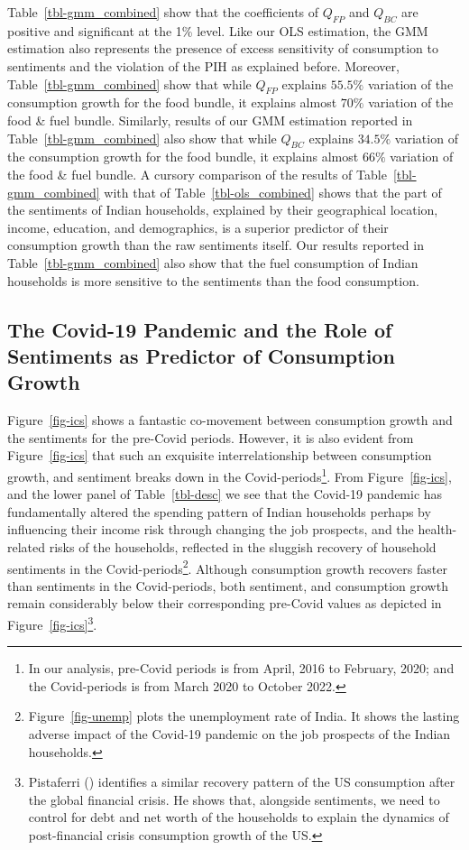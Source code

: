\documentclass[
  abstract]{scrartcl}
\begin{document}
Table~\ref{tbl-gmm_combined} show that the coefficients of \(Q_{FP}\)
and \(Q_{BC}\) are positive and significant at the 1\% level. Like our
OLS estimation, the GMM estimation also represents the presence of
excess sensitivity of consumption to sentiments and the violation of the
PIH as explained before. Moreover, Table~\ref{tbl-gmm_combined} show
that while \(Q_{FP}\) explains \(55.5\%\) variation of the consumption
growth for the food bundle, it explains almost \(70\%\) variation of the
food \& fuel bundle. Similarly, results of our GMM estimation reported
in Table~\ref{tbl-gmm_combined} also show that while \(Q_{BC}\) explains
\(34.5\%\) variation of the consumption growth for the food bundle, it
explains almost \(66\%\) variation of the food \& fuel bundle. A cursory
comparison of the results of Table~\ref{tbl-gmm_combined} with that of
Table~\ref{tbl-ols_combined} shows that the part of the sentiments of
Indian households, explained by their geographical location, income,
education, and demographics, is a superior predictor of their
consumption growth than the raw sentiments itself. Our results reported
in Table~\ref{tbl-gmm_combined} also show that the fuel consumption of
Indian households is more sensitive to the sentiments than the food
consumption.

\subsection{The Covid-19 Pandemic and the Role of Sentiments as
Predictor of Consumption
Growth}\label{the-covid-19-pandemic-and-the-role-of-sentiments-as-predictor-of-consumption-growth}

Figure~\ref{fig-ics} shows a fantastic co-movement between consumption
growth and the sentiments for the pre-Covid periods. However, it is also
evident from Figure~\ref{fig-ics} that such an exquisite
interrelationship between consumption growth, and sentiment breaks down
in the Covid-periods\footnote{In our analysis, pre-Covid periods is from
  April, 2016 to February, 2020; and the Covid-periods is from March
  2020 to October 2022.}. From Figure~\ref{fig-ics}, and the lower panel
of Table~\ref{tbl-desc} we see that the Covid-19 pandemic has
fundamentally altered the spending pattern of Indian households perhaps
by influencing their income risk through changing the job prospects, and
the health-related risks of the households, reflected in the sluggish
recovery of household sentiments in the Covid-periods\footnote{Figure~\ref{fig-unemp}
  plots the unemployment rate of India. It shows the lasting adverse
  impact of the Covid-19 pandemic on the job prospects of the Indian
  households.}. Although consumption growth recovers faster than
sentiments in the Covid-periods, both sentiment, and consumption growth
remain considerably below their corresponding pre-Covid values as
depicted in Figure~\ref{fig-ics}\footnote{Pistaferri
  () identifies a similar recovery
  pattern of the US consumption after the global financial crisis. He
  shows that, alongside sentiments, we need to control for debt and net
  worth of the households to explain the dynamics of post-financial
  crisis consumption growth of the US.}.
\end{document}
